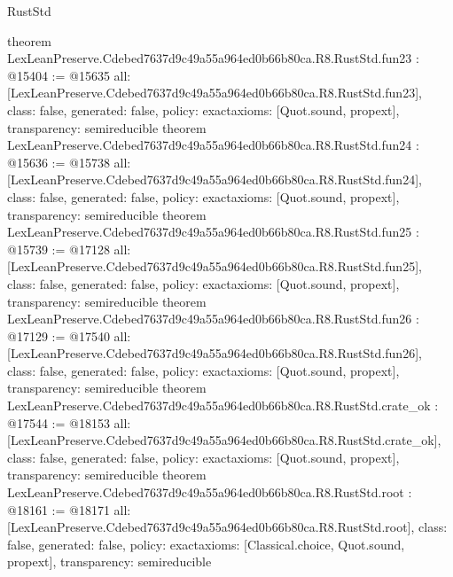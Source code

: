 \begin{lexlean}{RustStd}
\begin{coremodule}
{}
theorem LexLeanPreserve.Cdebed7637d9c49a55a964ed0b66b80ca.R8.RustStd.fun23 : @15404 := @15635 {
  all: [LexLeanPreserve.Cdebed7637d9c49a55a964ed0b66b80ca.R8.RustStd.fun23],
  class: false,
  generated: false,
  policy: exact{axioms: [Quot.sound, propext]},
  transparency: semireducible
}
theorem LexLeanPreserve.Cdebed7637d9c49a55a964ed0b66b80ca.R8.RustStd.fun24 : @15636 := @15738 {
  all: [LexLeanPreserve.Cdebed7637d9c49a55a964ed0b66b80ca.R8.RustStd.fun24],
  class: false,
  generated: false,
  policy: exact{axioms: [Quot.sound, propext]},
  transparency: semireducible
}
theorem LexLeanPreserve.Cdebed7637d9c49a55a964ed0b66b80ca.R8.RustStd.fun25 : @15739 := @17128 {
  all: [LexLeanPreserve.Cdebed7637d9c49a55a964ed0b66b80ca.R8.RustStd.fun25],
  class: false,
  generated: false,
  policy: exact{axioms: [Quot.sound, propext]},
  transparency: semireducible
}
theorem LexLeanPreserve.Cdebed7637d9c49a55a964ed0b66b80ca.R8.RustStd.fun26 : @17129 := @17540 {
  all: [LexLeanPreserve.Cdebed7637d9c49a55a964ed0b66b80ca.R8.RustStd.fun26],
  class: false,
  generated: false,
  policy: exact{axioms: [Quot.sound, propext]},
  transparency: semireducible
}
theorem LexLeanPreserve.Cdebed7637d9c49a55a964ed0b66b80ca.R8.RustStd.crate_ok : @17544 := @18153 {
  all: [LexLeanPreserve.Cdebed7637d9c49a55a964ed0b66b80ca.R8.RustStd.crate_ok],
  class: false,
  generated: false,
  policy: exact{axioms: [Quot.sound, propext]},
  transparency: semireducible
}
theorem LexLeanPreserve.Cdebed7637d9c49a55a964ed0b66b80ca.R8.RustStd.root : @18161 := @18171 {
  all: [LexLeanPreserve.Cdebed7637d9c49a55a964ed0b66b80ca.R8.RustStd.root],
  class: false,
  generated: false,
  policy: exact{axioms: [Classical.choice, Quot.sound, propext]},
  transparency: semireducible
}


\end{coremodule}
\end{lexlean}
